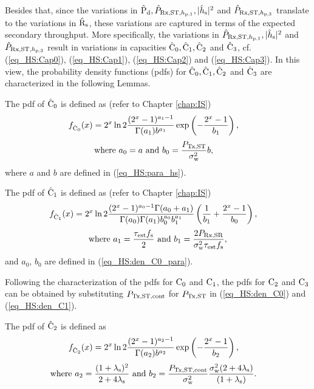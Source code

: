 Besides that, since the variations in $\hat{\text{P}}_{\text{d}}, \hat{P}_{\text{Rx,ST,$h_{\text{p,1}}$}}, |\hat{h}_{\text{s}}|^2$ and $\hat{P}_{\text{Rx,ST,$h_{\text{p,3}}$}}$ translate to the variations in $\hat{\text{{R}}}_{\text{s}}$, these variations are captured in terms of the expected secondary throughput. More specifically, the variations in $\hat{P}_{\text{Rx,ST,$h_{\text{p,1}}$}}, |\hat{h}_{\text{s}}|^2$ and $\hat{P}_{\text{Rx,ST,$h_{\text{p,3}}$}}$ result in variations in capacities $\hat{\text{C}}_{\text{0}}, \hat{\text{C}}_{\text{1}}, \hat{\text{C}}_{\text{2}}$ and $\hat{\text{C}}_{\text{3}}$, cf. (\ref{eq_HS:Cap0}), (\ref{eq_HS:Cap1}), (\ref{eq_HS:Cap2}) and (\ref{eq_HS:Cap3}). In this view, the probability density functions (pdfs) for $\hat{\text{C}}_{\text{0}}, \hat{\text{C}}_{\text{1}}, \hat{\text{C}}_{\text{2}}$ and $\hat{\text{C}}_{\text{3}}$ are characterized in the following Lemmas.
\begin{lemma} \label{lm_HS:lem3}
\normalfont
The pdf of $\hat{\text{C}}_{\text{0}}$ is defined as (refer to Chapter \ref{chap:IS}) 
\begin{align}
f_{\hat{\text{C}}_{\text{0}}}(x) &= 2^x \ln 2 \frac{(2^x - 1)^{a_1 - 1}}{\Gamma(a_1) b^{a_1}} \exp\left(-\frac{2^x - 1}{b_1}\right),  \label{eq_HS:den_C0}
\end{align}
\begin{align}
\text{where  } a_0 = a &\text{ and } b_0 = \frac{P_{\text{Tx,ST}}}{\sigma^2_{\text{w}}} b,  \label{eq_HS:den_C0_para} 
\end{align}
where $a$ and $b$ are defined in (\ref{eq_HS:para_hs}).
\end{lemma}

\begin{lemma} \label{lm_HS:lem4} 
\normalfont
The pdf of $\hat{\text{C}}_{\text{1}}$ is defined as (refer to Chapter \ref{chap:IS})  
\begin{align}
f_{\hat{\text{C}}_{\text{1}}}(x) &= 2^x \ln 2 \frac{(2^x - 1)^{a_0 - 1} \Gamma(a_0 + a_1)}{\Gamma(a_0) \Gamma(a_1) b_0^{a_0} b_1^{a_1}} \left(\frac{1}{b_1} + \frac{2^x - 1}{b_0}\right), \label{eq_HS:den_C1}
\end{align}
\begin{align}
\text{where  } a_1 = \frac{\tau_{\text{est}} f_{\text{s}}}{2}  \text{  and  } b_1 = \frac{2 P_{\text{Rx,SR}}}{\sigma^2_{\text{w}} \tau_{\text{est}} f_{\text{s}}}, \label{eq_HS:den_C1_para} 
\end{align}
and $a_0$, $b_0$ are defined in (\ref{eq_HS:den_C0_para}).
\end{lemma}
Following the characterization of the pdfs for $\text{C}_{\text{0}}$ and $\text{C}_{\text{1}}$, the pdfs for $\text{C}_{\text{2}}$ and $\text{C}_{\text{3}}$ can be obtained by substituting $P_{\text{Tx,ST,cont}}$ for $P_{\text{Tx,ST}}$ in (\ref{eq_HS:den_C0}) and (\ref{eq_HS:den_C1}).
\begin{lemma} \label{lm_HS:lem5}
\normalfont
The pdf of $\hat{\text{C}}_{\text{2}}$ is defined as
\begin{align}
f_{\hat{\text{C}}_{\text{2}}}(x) &= 2^x \ln 2 \frac{(2^x - 1)^{a_2 - 1}}{\Gamma(a_2) b^{a_2}} \exp\left(-\frac{2^x - 1}{b_2}\right),  \label{eq_HS:den_C2}
\end{align}
\begin{align}
\text{where  } a_2 = \frac{(1 + \lambda_{\text{s}})^2}{2 + 4 \lambda_{\text{s}}} &\text{ and } b_2 = \frac{P_{\text{Tx,ST,cont}}}{\sigma^2_{\text{w}}}\frac{\sigma^2_{\text{w}} (2 + 4 \lambda_{\text{s}})}{(1 + \lambda_{\text{s}})}.  \label{eq_HS:den_C2_para} 
\end{align}
\end{lemma}

